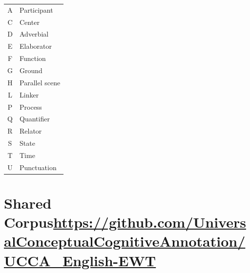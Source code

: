 \documentclass[extrafontsizes,60pt,twocolumn]{memoir}
\begin{document}
\begin{minipage}{.13\columnwidth}\color{white}
\renewcommand{\arraystretch}{1.5}
  \begin{adjustbox}{margin=.5in,frame,scale=.75,bgcolor=Navy}
  \begin{tabular}{>{\ttfamily\LARGE}c@{\hskip 1in\bfseries}l}
    A & Participant \\
    C & Center \\
    D & Adverbial \\
    E & Elaborator \\
    F & Function \\
    G & Ground \\
    H & Parallel scene \\
    L & Linker \\
    P & Process \\
    Q & Quantifier \\
    R & Relator \\
    S & State \\
    T & Time \\
    U & Punctuation
  \end{tabular}
  \end{adjustbox}
\end{minipage}
\hspace{-.6in}

\section*{Shared Corpus\hfill\normalsize\url{https://github.com/UniversalConceptualCognitiveAnnotation/UCCA_English-EWT}}
\end{document}
